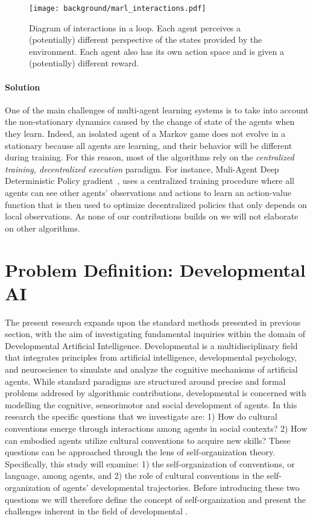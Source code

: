 \begin{figure}[!h]
\centering
\texttt{[image: background/marl\_interactions.pdf]}	
\caption{Diagram of interactions in a \marl loop. Each agent perceives a (potentially) different perspective of the states provided by the environment. Each agent also has its own action space and is given a (potentially) different reward.}
\label{fig:marl_interactions}
\end{figure}

\paragraph{Solution}

One of the main challenges of multi-agent learning systems is to take into account the non-stationary dynamics caused by the change of state of the agents when they learn. Indeed, an isolated agent of a Markov game does not evolve in a stationary \mdp because all agents are learning, and their behavior will be different during training. For this reason, most of the \marl algorithms rely on the \textit{centralized training, decentralized execution} paradigm. For instance, Muli-Agent Deep Deterministic Policy gradient~\citep{lowe2017multi}, uses a centralized training procedure where all agents can see other agents' observations and actions to learn an action-value function that is then used to optimize decentralized policies that only depends on local observations. As none of our contributions builds on \marl we will not elaborate on other \marl algorithms.

\newpage

\section{Problem Definition: Developmental AI}

The present research expands upon the standard \ai methods presented in previous section, with the aim of investigating fundamental inquiries within the domain of \gls{Developmental Artificial Intelligence}. Developmental \ai is a multidisciplinary field that integrates principles from artificial intelligence, developmental psychology, and neuroscience to simulate and analyze the cognitive mechanisms of artificial agents. While standard \ai paradigms are structured around precise and formal problems addresed by algorithmic contributions, developmental \ai is concerned with modelling the cognitive, sensorimotor and social development of agents. In this research the specific questions that we investigate are: 1) How do cultural conventions emerge through interactions among agents in social contexts? 2) How can embodied agents utilize cultural conventions to acquire new skills? These questions can be approached through the lens of self-organization theory. Specifically, this study will examine: 1) the self-organization of conventions, or language, among agents, and 2) the role of cultural conventions in the self-organization of agents' developmental trajectories. Before introducing these two questions we will therefore define the concept of self-organization and present the challenges inherent in the field of developmental \ai.

